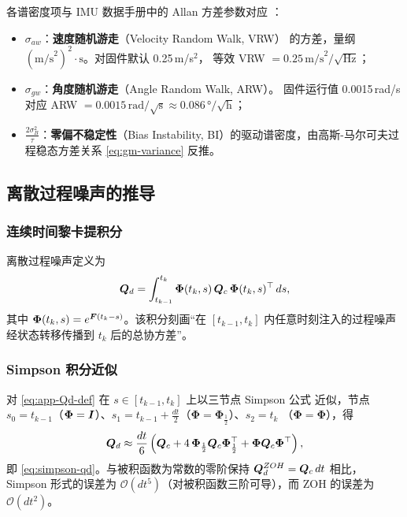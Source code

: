 各谱密度项与 IMU 数据手册中的 Allan 方差参数对应
\cite{Groves2013,Titterton2014}：
\begin{itemize}
  \item $\sigma_{aw}$：\textbf{速度随机游走}（Velocity Random Walk, VRW）
    的方差，量纲 $(\text{m/s}^2)^2\cdot\text{s}$。对固件默认 0.25\,m/s$^2$，
    等效 VRW $= 0.25\,\text{m/s}^2/\sqrt{\text{Hz}}$；
  \item $\sigma_{gw}$：\textbf{角度随机游走}（Angle Random Walk, ARW）。
    固件运行值 0.0015\,rad/s 对应 ARW $= 0.0015\,\text{rad}/\sqrt{\text{s}}
    \approx 0.086\,°/\!\sqrt{\text{h}}$；
  \item $\frac{2\sigma_B^2}{\tau}$：\textbf{零偏不稳定性}（Bias Instability,
    BI）的驱动谱密度，由高斯-马尔可夫过程稳态方差关系
    \cref{eq:gm-variance} 反推。
\end{itemize}

\subsection{离散过程噪声的推导}

\subsubsection{连续时间黎卡提积分}

离散过程噪声定义为
\begin{equation}
  \boldsymbol{Q}_d = \int_{t_{k-1}}^{t_k}
    \bm{\Phi}(t_k, s)\,\boldsymbol{Q}_c\,\bm{\Phi}(t_k, s)^{\top}\,ds,
  \label{eq:app-Qd-def}
\end{equation}
其中 $\bm{\Phi}(t_k, s) = e^{\boldsymbol{F}(t_k - s)}$。该积分刻画``在 $[t_{k-1}, t_k]$
内任意时刻注入的过程噪声经状态转移传播到 $t_k$ 后的总协方差''。

\subsubsection{Simpson 积分近似}

对 \cref{eq:app-Qd-def} 在 $s \in [t_{k-1}, t_k]$ 上以三节点 Simpson 公式
近似，节点 $s_0 = t_{k-1}$（$\bm{\Phi} = \boldsymbol{I}$）、$s_1 = t_{k-1} +
\frac{dt}{2}$（$\bm{\Phi} = \bm{\Phi}_{\frac12}$）、$s_2 = t_k$
（$\bm{\Phi} = \bm{\Phi}$），得
\begin{equation}
  \boldsymbol{Q}_d \approx \frac{dt}{6}\left(
    \boldsymbol{Q}_c + 4\,\bm{\Phi}_{\frac12}\boldsymbol{Q}_c\bm{\Phi}_{\frac12}^{\top}
    + \bm{\Phi}\boldsymbol{Q}_c\bm{\Phi}^{\top}
  \right),
  \label{eq:app-simpson}
\end{equation}
即 \cref{eq:simpson-qd}。与被积函数为常数的零阶保持
$\boldsymbol{Q}_d^{ZOH} = \boldsymbol{Q}_c\,dt$ 相比，Simpson 形式的误差为
$\mathcal{O}(dt^5)$（对被积函数三阶可导），而 ZOH 的误差为
$\mathcal{O}(dt^2)$。

